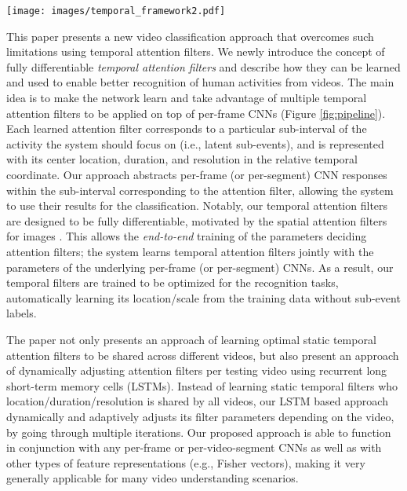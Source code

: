 \documentclass[letterpaper]{article}
\begin{document}
\begin{figure*}
\begin{center}
   \texttt{[image: images/temporal\_framework2.pdf]}
\end{center}
   \caption{Illustration of our overall recognition architecture with temporal attention filters.  number of temporal filters are learned to focus on different temporal part of video frame features (i.e., latent sub-events). Each filter is composed of a set of Gaussian filters which take a weighted sum of local information. Outputs of the temporal filters are concatenated, and attached with a fully connected layers to perform video classification. }
\label{fig:pipeline}		
\end{figure*}










This paper presents a new video classification approach that overcomes such limitations using temporal attention filters. We newly introduce the concept of fully differentiable \emph{temporal attention filters} and describe how they can be learned and used to enable better recognition of human activities from videos. The main idea is to make the network learn and take advantage of multiple temporal attention filters to be applied on top of per-frame CNNs (Figure \ref{fig:pipeline}). Each learned attention filter corresponds to a particular sub-interval of the activity the system should focus on (i.e., latent sub-events), and is represented with its center location, duration, and resolution in the relative temporal coordinate. Our approach abstracts per-frame (or per-segment) CNN responses within the sub-interval corresponding to the attention filter, allowing the system to use their results for the classification. Notably, our temporal attention filters are designed to be fully differentiable, motivated by the spatial attention filters for images \cite{attention15}. This allows the \emph{end-to-end} training of the parameters deciding attention filters; the system learns temporal attention filters jointly with the parameters of the underlying per-frame (or per-segment) CNNs. As a result, our temporal filters are trained to be optimized for the recognition tasks, automatically learning its location/scale from the training data without sub-event labels.


The paper not only presents an approach of learning optimal static temporal attention filters to be shared across different videos, but also present an approach of dynamically adjusting attention filters per testing video using recurrent long short-term memory cells (LSTMs). Instead of learning static temporal filters who location/duration/resolution is shared by all videos, our LSTM based approach dynamically and adaptively adjusts its filter parameters depending on the video, by going through multiple iterations. Our proposed approach is able to function in conjunction with any per-frame or per-video-segment CNNs as well as with other types of feature representations (e.g., Fisher vectors), making it very generally applicable for many video understanding scenarios.
\end{document}
